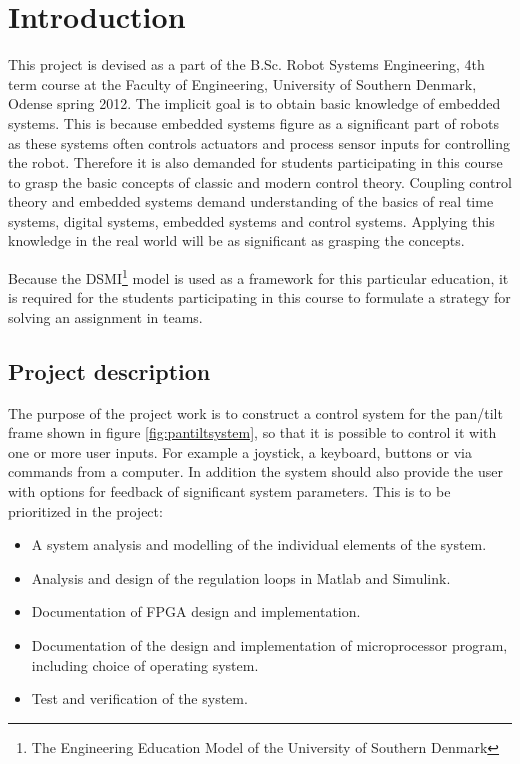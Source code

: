 \chapter{Introduction}\label{chap:intro}

This project is devised as a part of the B.Sc. Robot Systems Engineering, 4th term course at the Faculty of Engineering, University of Southern Denmark, Odense spring 2012. The implicit goal is to obtain basic knowledge of embedded systems. This is because embedded systems figure as a significant part of robots as these systems often controls actuators and process sensor inputs for controlling the robot. Therefore it is also demanded for students participating in this course to grasp the basic concepts of classic and modern control theory. Coupling control theory and embedded systems demand understanding of the basics of real time systems, digital systems, embedded systems and control systems. Applying this knowledge in the real world will be as significant as grasping the concepts.

Because the DSMI\footnote{The Engineering Education Model of the University of Southern Denmark} model is used as a framework for this particular education, it is required for the students participating in this course to formulate a strategy for solving an assignment in teams.

\section{Project description}
The purpose of the project work is to construct a control system for the pan/tilt frame shown in figure \ref{fig:pantiltsystem}, so that it is possible to control it with one or more user inputs. For example a joystick, a keyboard, buttons or via commands from a computer. In addition the system should also provide the user with options for feedback of significant system parameters. This is to be prioritized in the project:
\begin{itemize}
  \item A system analysis and modelling of the individual elements of the system.
  \item Analysis and design of the regulation loops in Matlab and Simulink.
  \item Documentation of FPGA design and implementation.
  \item Documentation of the design and implementation of microprocessor program, including choice of operating system.
  \item Test and verification of the system.
\end{itemize}



